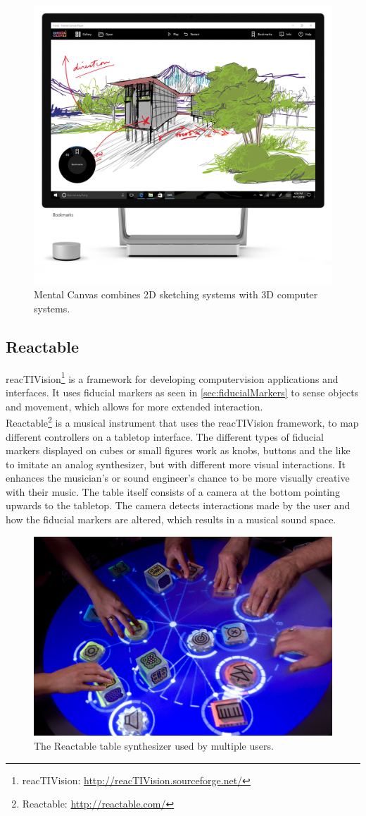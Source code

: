 				\begin{figure}[H]
					\centering
					\includegraphics[width=0.5\linewidth]{figure/Analysis/mentalCanvas.png}
					\caption{Mental Canvas combines 2D sketching systems with 3D computer systems.}
					\label{fig:mentalCanvas}
				\end{figure}

		
		\subsection{Reactable}
			reacTIVision\footnote{reacTIVision: \url{http://reacTIVision.sourceforge.net/}} is a framework for developing computervision applications and interfaces. It uses fiducial markers as seen in  \autoref{sec:fiducialMarkers} to sense objects and movement, which allows for more extended interaction. \\
			
			Reactable\footnote{Reactable: \url{http://reactable.com/}} is a musical instrument that uses the reacTIVision framework, to map different controllers on a tabletop interface. The different types of fiducial markers displayed on cubes or small figures work as knobs, buttons and the like to imitate an analog synthesizer, but with different more visual interactions. It enhances the musician's or sound engineer's chance to be more visually creative with their music. The table itself consists of a camera at the bottom pointing upwards to the tabletop. The camera detects interactions made by the user and how the fiducial markers are altered, which results in a musical sound space.
				\begin{figure}[H]
					\centering
					\includegraphics[width=0.6\linewidth]{figure/Analysis/reactable}
					\caption{The Reactable table synthesizer used by multiple users.}
					\label{fig:reactable}
				\end{figure} 
			
